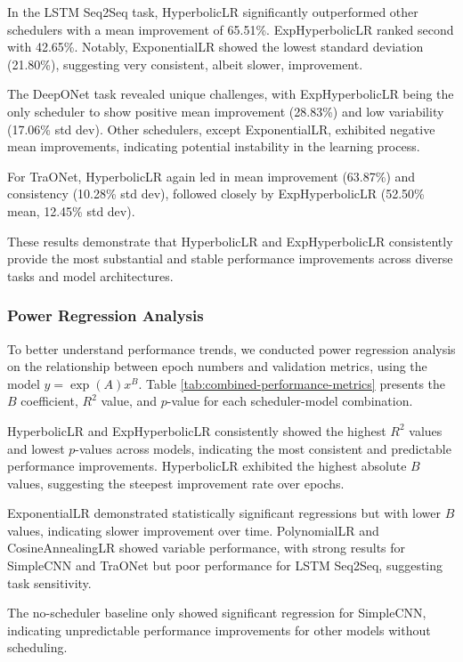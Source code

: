 \documentclass{article}
\theoremstyle{plain}
\theoremstyle{definition}
\theoremstyle{remark}
\begin{document}
In the LSTM Seq2Seq task, HyperbolicLR significantly outperformed other schedulers with a mean improvement of 65.51\%. ExpHyperbolicLR ranked second with 42.65\%. Notably, ExponentialLR showed the lowest standard deviation (21.80\%), suggesting very consistent, albeit slower, improvement.

The DeepONet task revealed unique challenges, with ExpHyperbolicLR being the only scheduler to show positive mean improvement (28.83\%) and low variability (17.06\% std dev). Other schedulers, except ExponentialLR, exhibited negative mean improvements, indicating potential instability in the learning process.

For TraONet, HyperbolicLR again led in mean improvement (63.87\%) and consistency (10.28\% std dev), followed closely by ExpHyperbolicLR (52.50\% mean, 12.45\% std dev).

These results demonstrate that HyperbolicLR and ExpHyperbolicLR consistently provide the most substantial and stable performance improvements across diverse tasks and model architectures.

\subsubsection{Power Regression Analysis}
\label{subsubsec:power_regression}

To better understand performance trends, we conducted power regression analysis on the relationship between epoch numbers and validation metrics, using the model $y = \exp(A) x^B$. Table \ref{tab:combined-performance-metrics} presents the $B$ coefficient, $R^2$ value, and $p$-value for each scheduler-model combination.

HyperbolicLR and ExpHyperbolicLR consistently showed the highest $R^2$ values and lowest $p$-values across models, indicating the most consistent and predictable performance improvements. HyperbolicLR exhibited the highest absolute $B$ values, suggesting the steepest improvement rate over epochs.

ExponentialLR demonstrated statistically significant regressions but with lower $B$ values, indicating slower improvement over time. PolynomialLR and CosineAnnealingLR showed variable performance, with strong results for SimpleCNN and TraONet but poor performance for LSTM Seq2Seq, suggesting task sensitivity.

The no-scheduler baseline only showed significant regression for SimpleCNN, indicating unpredictable performance improvements for other models without scheduling.
\end{document}
